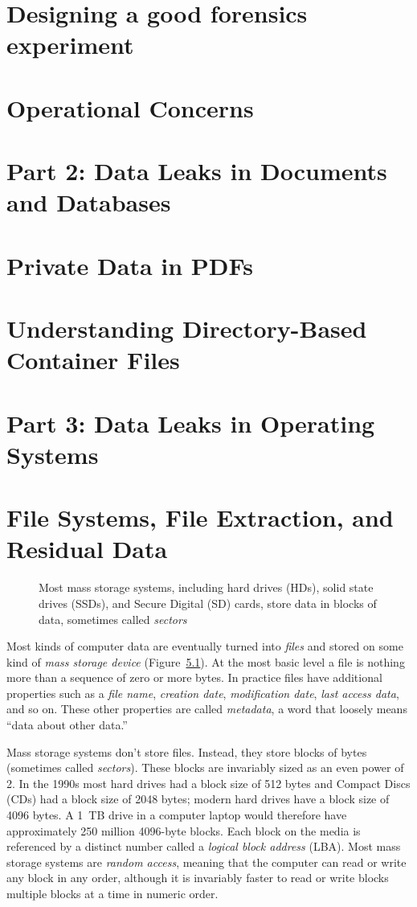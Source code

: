 \documentclass[11pt,letter]{book}
\newcommand{\figref}[1]{Figure~\ref{#1}\xspace}
\newcommand{\sgraphic}[3][width=\linewidth]{
  \begin{figure}
  \begin{center}
  \fbox{\texttt{[image: \#2]}}
  \end{center}
  \caption{#3\label{#2}}
  \end{figure}
}
\begin{document}
\chapter{Designing a good forensics experiment}
\chapter{Operational Concerns}
\chapter*{Part 2: Data Leaks in Documents and Databases}
\chapter{Private Data in PDFs}
\chapter{Understanding Directory-Based Container Files}
\chapter*{Part 3: Data Leaks in Operating Systems}
\chapter{File Systems, File Extraction, and Residual Data}
\sgraphic{art/TK}{Most mass storage systems, including hard drives (HDs),
  solid state drives (SSDs), and Secure Digital (SD) cards, store data
  in blocks of data, sometimes called \emph{sectors}}

Most kinds of computer data are eventually turned into \emph{files}
and stored on some kind of
\emph{mass storage device} (\figref{art/TK}). At the most basic level a file is
nothing more than a sequence of zero or more bytes. In practice files
have additional properties such as a \emph{file name}, 
\emph{creation date}, \emph{modification date}, \emph{last access
  data}, and so on. These other properties are called \emph{metadata},
a word that loosely means ``data about other data.''

Mass storage systems don't store files. Instead, they store blocks of
bytes (sometimes called \emph{sectors}). These blocks are invariably
sized as an even power of 2. In the 1990s most hard drives had a block
size of 512 bytes and Compact Discs (CDs) had a block size of 2048
bytes; modern hard drives have a block size of 4096 bytes. A 1~TB
drive in a computer laptop would therefore have approximately 250
million 4096-byte blocks. Each block on the media is referenced
by a distinct number called a \emph{logical block address} (LBA). Most
mass storage systems are \emph{random access}, meaning that the
computer can read or write any block in any order, although it is
invariably faster to read or write blocks multiple blocks at a time in numeric order.
\end{document}
